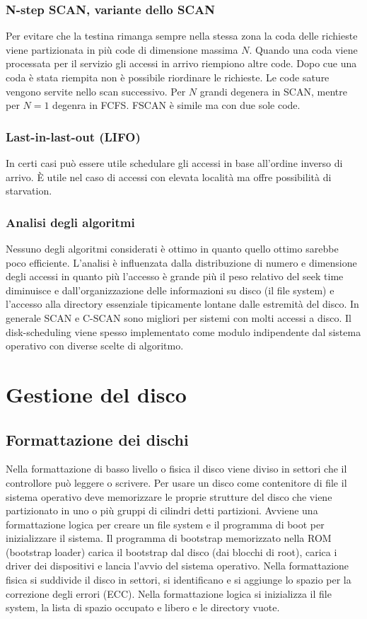 \subsubsection{N-step SCAN, variante dello SCAN}
Per evitare che la testina rimanga sempre nella stessa zona la coda delle richieste viene partizionata in pi\`u code di dimensione massima $N$. Quando una coda viene processata per
il servizio gli accessi in arrivo riempiono altre code. Dopo cue una coda \`e stata riempita non \`e possibile riordinare le richieste. Le code sature vengono servite nello scan 
successivo. Per $N$ grandi degenera in SCAN, mentre per $N = 1$ degenra in FCFS. FSCAN \`e simile ma con due sole code. 
\subsubsection{Last-in-last-out (LIFO)}
In certi casi pu\`o essere utile schedulare gli accessi in base all'ordine inverso di arrivo. \`E utile nel caso di accessi con elevata localit\`a ma offre possibilit\`a di 
starvation. 
\subsubsection{Analisi degli algoritmi}
Nessuno degli algoritmi considerati \`e ottimo in quanto quello ottimo sarebbe poco efficiente. L'analisi \`e influenzata dalla distribuzione di numero e dimensione degli accessi in
quanto pi\`u l'accesso \`e grande pi\`u il peso relativo del seek time diminuisce e dall'organizzazione delle informazioni su disco (il file system) e l'accesso alla directory 
essenziale tipicamente lontane dalle estremit\`a del disco. In generale SCAN e C-SCAN sono migliori per sistemi con molti accessi a disco. Il disk-scheduling viene spesso implementato
come modulo indipendente dal sistema operativo con diverse scelte di algoritmo. 
\section{Gestione del disco}
\subsection{Formattazione dei dischi}
Nella formattazione di basso livello o fisica il disco viene diviso in settori che il controllore pu\`o leggere o scrivere. Per usare un disco come contenitore di file il sistema 
operativo deve memorizzare le proprie strutture del disco che viene partizionato in uno o pi\`u gruppi di cilindri detti partizioni. Avviene una formattazione logica per creare un 
file system e il programma di boot per inizializzare il sistema. Il programma di bootstrap memorizzato nella ROM (bootstrap loader) carica il bootstrap dal disco (dai blocchi di root), 
carica i driver dei dispositivi e lancia l'avvio del sistema operativo. Nella formattazione fisica si suddivide il disco in settori, si identificano e si aggiunge lo spazio per la 
correzione degli errori (ECC). Nella formattazione logica si inizializza il file system, la lista di spazio occupato e libero e le directory vuote.
